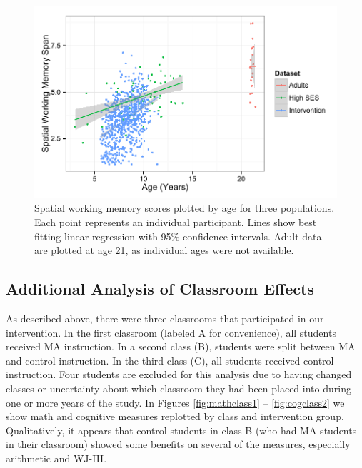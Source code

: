 \documentclass[11pt]{article}
\begin{document}
\begin{figure}[H]
\begin{center}
\includegraphics[width=4.5in]{figures/swm.pdf}
\end{center}
\caption{Spatial working memory scores plotted by age for three populations. Each point represents an individual participant. Lines show best fitting linear regression with 95\% confidence intervals. Adult data are plotted at age 21, as individual ages were not available.}
\label{fig:swm}
\end{figure}


\subsection{Additional Analysis of Classroom Effects}

As described above, there were three classrooms that participated in our intervention. In the first classroom (labeled A for convenience), all students received MA instruction. In a second class (B), students were split between MA and control instruction. In the third class (C), all students received control instruction. Four students are excluded for this analysis due to having changed classes or uncertainty about which classroom they had been placed into during one or more years of the study. In Figures \ref{fig:mathclass1} -- \ref{fig:cogclass2} we show math and cognitive measures replotted by class and intervention group. Qualitatively, it appears that control students in class B (who had MA students in their classroom) showed some benefits on several of the measures, especially arithmetic and WJ-III.
\end{document}
